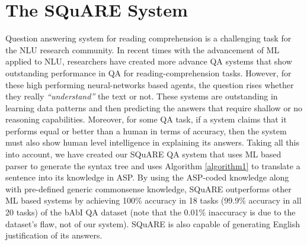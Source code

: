 \documentclass[letterpaper]{article}
\begin{document}


\section{The SQuARE System}
Question answering system for reading comprehension is a challenging task for the NLU research community. In recent times with the advancement of ML applied to NLU, researchers have created more advance QA systems that show outstanding performance in QA for reading-comprehension tasks. However, for these high performing neural-networks based agents, the question rises whether they really \textit{``understand''} the text or not. These systems are outstanding in learning data patterns and then predicting the answers that require shallow or no reasoning capabilities. Moreover, for some QA task, if a system claims that it performs equal or better than a human in terms of accuracy, then the system must also show human level intelligence in explaining its answers. Taking all this into account, we have created our SQuARE QA system that uses ML based parser to generate the syntax tree and uses Algorithm \ref{algorithm1} to translate a sentence into its knowledge in ASP. By using the ASP-coded knowledge along with pre-defined generic commonsense knowledge, SQuARE outperforms other ML based systems by achieving 100\% accuracy in 18 tasks (99.9\% accuracy in all 20 tasks) of the bAbI QA dataset (note that the 0.01\% inaccuracy is due to the dataset's flaw, not of our system). SQuARE is also capable of generating English justification of its answers. 
\end{document}
